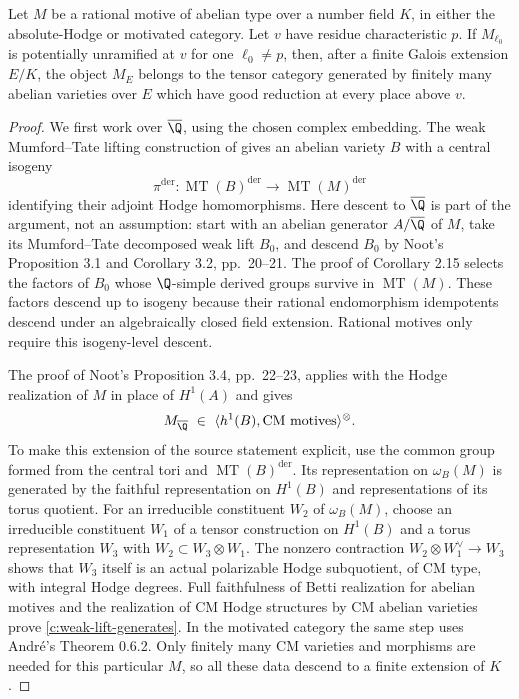 \begin{lemma}
\label{c:potentially-good-generator}
Let $M$ be a rational motive of abelian type over a number field $K$, in either
the absolute-Hodge or motivated category.  Let $v$ have residue characteristic
$p$.  If $M_{\ell_0}$ is potentially unramified at $v$ for one $\ell_0\ne p$,
then, after a finite Galois extension $E/K$, the object $M_E$ belongs to the
tensor category generated by finitely many abelian varieties over $E$ which
have good reduction at every place above $v$.
\end{lemma}

\begin{proof}
We first work over $\overline\Q$, using the chosen complex embedding.
The weak Mumford--Tate lifting construction of
\citet[Theorem 2.12 and Corollary 2.15, pp.~15--20]{c_noot2006} gives an
abelian variety $B$ with a central isogeny
\[
 \pi^{\mathrm{der}}:\operatorname{MT}(B)^{\mathrm{der}}
       \longrightarrow\operatorname{MT}(M)^{\mathrm{der}}
\]
identifying their adjoint Hodge homomorphisms.  Here descent to
$\overline\Q$ is part of the argument, not an assumption: start with an
abelian generator $A/\overline\Q$ of $M$, take its Mumford--Tate decomposed
weak lift $B_0$, and descend $B_0$ by Noot's Proposition 3.1 and Corollary 3.2,
pp.~20--21.  The proof of Corollary 2.15 selects the factors of $B_0$ whose
$\Q$-simple derived groups survive in $\operatorname{MT}(M)$.  These factors
descend up to isogeny because their rational endomorphism idempotents descend
under an algebraically closed field extension.  Rational motives only require
this isogeny-level descent.

The proof of Noot's Proposition 3.4, pp.~22--23, applies with the Hodge
realization of $M$ in place of $H^1(A)$ and gives
\begin{equation}
\label{c:weak-lift-generates}
 M_{\overline\Q}\ \in\
 \langle h^1(B),\text{CM motives}\rangle^{\otimes}.
\end{equation}
To make this extension of the source statement explicit, use the common
group formed from the central tori and $\operatorname{MT}(B)^{\mathrm{der}}$.
Its representation on $\omega_B(M)$ is generated by the faithful
representation on $H^1(B)$ and representations of its torus quotient.
For an irreducible constituent $W_2$ of $\omega_B(M)$, choose an irreducible
constituent $W_1$ of a tensor construction on $H^1(B)$ and a torus
representation $W_3$ with $W_2\subset W_3\otimes W_1$.
The nonzero contraction $W_2\otimes W_1^\vee\to W_3$ shows that $W_3$ itself
is an actual polarizable Hodge subquotient, of CM type, with integral
Hodge degrees.  Full faithfulness of Betti realization for abelian motives
and the realization of CM Hodge structures by CM abelian varieties prove
\eqref{c:weak-lift-generates}.  In the motivated category the same step uses
Andr\'e's Theorem 0.6.2.  Only finitely many CM varieties and morphisms are
needed for this particular $M$, so all these data descend to a finite
extension of $K$.


\end{proof}

